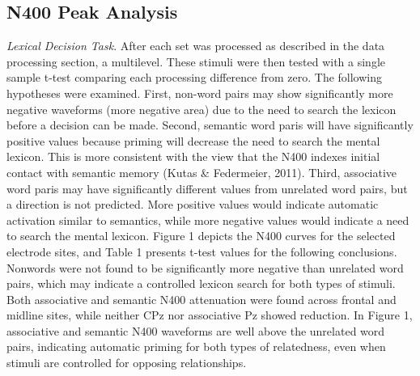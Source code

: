 \documentclass[english,man]{apa6}
\theoremstyle{definition}
\theoremstyle{definition}
\theoremstyle{definition}
\theoremstyle{remark}
\begin{document}
\subsection{N400 Peak Analysis}\label{n400-peak-analysis}

\emph{Lexical Decision Task}. After each set was processed as described
in the data processing section, a multilevel. These stimuli were then
tested with a single sample t-test comparing each processing difference
from zero. The following hypotheses were examined. First, non-word pairs
may show significantly more negative waveforms (more negative area) due
to the need to search the lexicon before a decision can be made. Second,
semantic word paris will have significantly positive values because
priming will decrease the need to search the mental lexicon. This is
more consistent with the view that the N400 indexes initial contact with
semantic memory (Kutas \& Federmeier, 2011). Third, associative word
paris may have significantly different values from unrelated word pairs,
but a direction is not predicted. More positive values would indicate
automatic activation similar to semantics, while more negative values
would indicate a need to search the mental lexicon. Figure 1 depicts the
N400 curves for the selected electrode sites, and Table 1 presents
t-test values for the following conclusions. Nonwords were not found to
be significantly more negative than unrelated word pairs, which may
indicate a controlled lexicon search for both types of stimuli. Both
associative and semantic N400 attenuation were found across frontal and
midline sites, while neither CPz nor associative Pz showed reduction. In
Figure 1, associative and semantic N400 waveforms are well above the
unrelated word pairs, indicating automatic priming for both types of
relatedness, even when stimuli are controlled for opposing
relationships.
\end{document}
